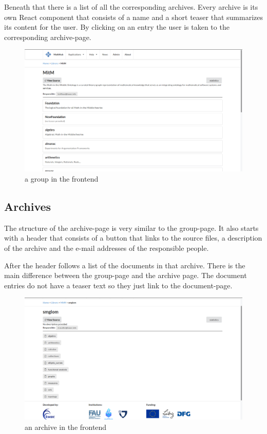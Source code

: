 \documentclass[11pt,a4paper]{article}
\begin{document}
Beneath that there is a list of all the corresponding archives.
Every archive is its own React component that consists of a name and a short teaser that summarizes its content for the user.
By clicking on an entry the user is taken to the corresponding archive-page.
\begin{figure}[H]
\includegraphics[width=1\textwidth]{group.png}
\caption{a group in the frontend}
\end{figure}

\subsection{Archives}
The structure of the archive-page is very similar to the group-page.
It also starts with a header that consists of a button that links to the source files, a description of the archive and the e-mail addresses of the responsible people.

After the header follows a list of the documents in that archive.
There is the main difference between the group-page and the archive page.
The document entries do not have a teaser text so they just link to the document-page.
\begin{figure}[H]
\includegraphics[width=1\textwidth]{archive.png}
\caption{ an archive in the frontend}
\end{figure}
\end{document}

